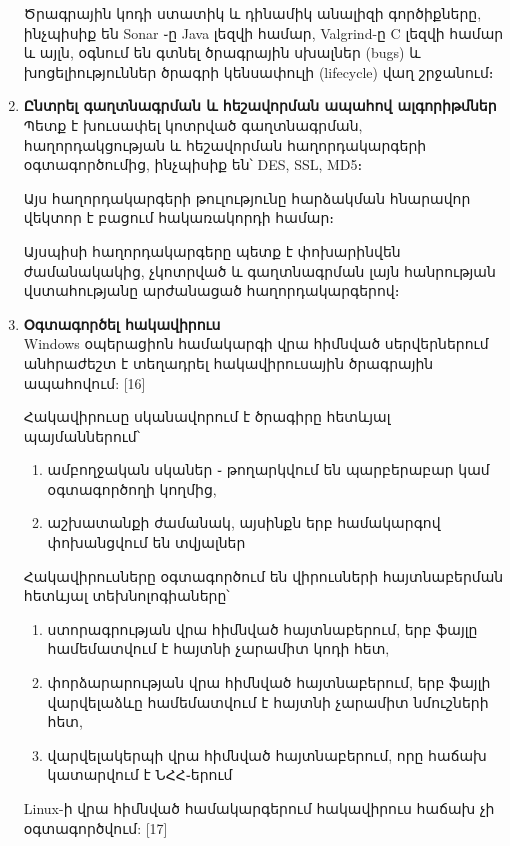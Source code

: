 \documentclass[a4paper,12pt]{article}
\begin{document}
\begin{sloppypar}
\begin{enumerate}
    Ծրագրային կոդի ստատիկ և դինամիկ անալիզի գործիքները, ինչպիսիք են
    Sonar ֊ը Java լեզվի համար, Valgrind-ը C լեզվի համար և այլն,
    օգնում են գտնել ծրագրային սխալներ (bugs) և խոցելիություններ ծրագրի
    կենսափուլի (lifecycle) վաղ շրջանում։
\item \textbf{Ընտրել գաղտնագրման և հեշավորման ապահով ալգորիթմներ}\\
    Պետք է խուսափել կոտրված գաղտնագրման, հաղորդակցության և
    հեշավորման հաղորդակարգերի օգտագործումից, ինչպիսիք են՝
	DES, SSL, MD5։

    Այս հաղորդակարգերի թուլությունը հարձակման հնարավոր
    վեկտոր է բացում հակառակորդի համար։

    Այսպիսի հաղորդակարգերը պետք է փոխարինվեն ժամանակակից,
    չկոտրված և գաղտնագրման լայն հանրության վստահությանը արժանացած
    հաղորդակարգերով։
\item \textbf{Օգտագործել հակավիրուս}\\
	Windows օպերացիոն համակարգի վրա հիմնված սերվերներում անհրաժեշտ է տեղադրել
	հակավիրուսային ծրագրային ապահովում: [16]

	Հակավիրուսը սկանավորում է ծրագիրը հետևյալ պայմաններում՝
	\begin{enumerate}
		\item ամբողջական սկաներ ֊ թողարկվում են պարբերաբար կամ օգտագործողի կողմից,
		\item աշխատանքի ժամանակ, այսինքն երբ համակարգով փոխանցվում են տվյալներ
	\end{enumerate}

	Հակավիրուսները օգտագործում են վիրուսների հայտնաբերման հետևյալ տեխնոլոգիաները՝

	\begin{enumerate}
	\item ստորագրության վրա հիմնված հայտնաբերում, երբ ֆայլը համեմատվում է հայտնի չարամիտ կոդի հետ,
	\item փորձարարության վրա հիմնված հայտնաբերում, երբ ֆայլի վարվելաձևը համեմատվում է հայտնի չարամիտ նմուշների հետ,
	\item վարվելակերպի վրա հիմնված հայտնաբերում, որը հաճախ կատարվում է ՆՀՀ֊երում
	\end{enumerate}

	Linux-ի վրա հիմնված համակարգերում հակավիրուս հաճախ չի օգտագործվում: [17]


\end{enumerate}
\end{sloppypar}
\end{document}

